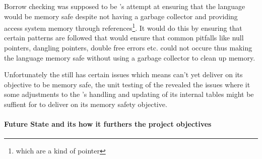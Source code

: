 Borrow checking was supposed to be \lang's attempt at ensuring that the language
would be memory safe despite not having a garbage collector and providing access
system memory through references\footnote{which are a kind of pointer}. It would do
this by ensuring that certain patterns are followed that would ensure that common
pitfalls like null pointers, dangling pointers, double free errors etc. could not
occure thus making the language memory safe without using a garbage collector to
clean up memory.

Unfortunately the \borrowChecker{} still has certain issues which means \lang{} can't
yet deliver on its objective to be memory safe, the unit testing of the
\borrowChecker{} revealed the issues where it some adjustments to the
\borrowChecker's handling and updating of its internal tables might be suffient for
\lang{} to deliver on its memory safety objective.

\paragraph*{Future State and its how it furthers the project objectives} \hfill



\newpage
